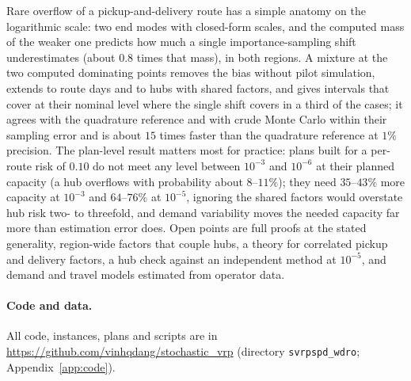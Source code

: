 \documentclass[ijoc,sglanonrev]{informs4}
\begin{document}
Rare overflow of a pickup-and-delivery route has a simple anatomy on the
logarithmic scale: two end modes with closed-form scales, and the computed mass of
the weaker one predicts how much a single importance-sampling shift underestimates
(about $0.8$ times that mass), in both regions. A mixture at the two computed
dominating points removes the bias without pilot simulation, extends to route days
and to hubs with shared factors, and gives intervals that cover at their nominal
level where the single shift covers in a third of the cases; it agrees with the
quadrature reference and with crude Monte Carlo within their sampling error and is
about $15$ times faster than the quadrature reference at $1\%$ precision. The
plan-level result matters most for practice: plans built for a per-route risk of
$0.10$ do not meet any level between $10^{-3}$ and $10^{-6}$ at their planned
capacity (a hub overflows with probability about $8$--$11\%$); they need $35$--$43\%$
more capacity at $10^{-3}$ and $64$--$76\%$ at $10^{-5}$, ignoring the shared factors
would overstate hub risk two- to threefold, and demand variability moves the needed
capacity far more than estimation error does. Open points are full proofs at the
stated generality, region-wide factors that couple hubs, a theory for correlated
pickup and delivery factors, a hub check against an independent method at $10^{-5}$,
and demand and travel models estimated from operator data.

\paragraph{Code and data.} All code, instances, plans and scripts are in
\url{https://github.com/vinhqdang/stochastic_vrp} (directory \texttt{svrpspd\_wdro};
Appendix~\ref{app:code}).
\end{document}
